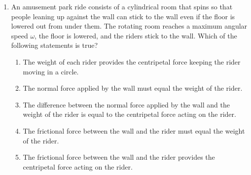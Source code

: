 \documentclass{../../../oss-apphys}
\begin{document}
\begin{multicols*}{2}
\begin{enumerate}[leftmargin=18pt,resume]
\begin{enumerate}[nosep,leftmargin=18pt,label=(\Alph*)]
    \item{}
     
   \item{}
    \end{enumerate}
    \columnbreak
    
  \item An amusement park ride consists of a cylindrical room that spins so
    that people leaning up against the wall can stick to the wall even if the
    floor is lowered out from under them. The rotating room reaches a maximum
    angular speed $\omega$, the floor is lowered, and the riders stick to
    the wall. Which of the following statements is true?
    \begin{enumerate}[nosep,leftmargin=18pt,label=(\Alph*)]
    \item The weight of each rider provides the centripetal force keeping the
      rider moving in a circle.
    \item The normal force applied by the wall must equal the weight of the
      rider.
    \item  The difference between the normal force applied by the wall and the
      weight of the rider is equal to the centripetal force acting on the rider.
    \item  The frictional force between the wall and the rider must equal the
      weight of the rider.
    \item  The frictional force between the wall and the rider provides the
      centripetal force acting on the rider.
    \end{enumerate}
  \end{enumerate}
  \columnbreak


\end{multicols*}
\end{document}
